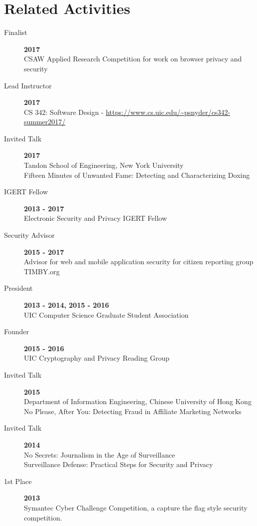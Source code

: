 \documentclass[wideaddress]{vitae}
\begin{document}
  \section{Related Activities}
  \begin{description}

    \item[Finalist] \hfill \textbf{2017}\\
    CSAW Applied Research Competition for work on browser privacy and security

    \item[Lead Instructor] \hfill \textbf{2017}\\
    CS 342: Software Design - \url{https://www.cs.uic.edu/~psnyder/cs342-summer2017/}

    \item[Invited Talk] \hfill \textbf{2017}\\
    Tandon School of Engineering, New York University\\
    Fifteen Minutes of Unwanted Fame: Detecting and Characterizing Doxing

    \item[IGERT Fellow] \hfill \textbf{2013 - 2017}\\
    Electronic Security and Privacy IGERT Fellow

    \item[Security Advisor] \hfill \textbf{2015 - 2017}\\
    Advisor for web and mobile application security for citizen reporting group TIMBY.org

    \item[President] \hfill \textbf{2013 - 2014, 2015 - 2016}\\
    UIC Computer Science Graduate Student Association

    \item[Founder] \hfill \textbf{2015 - 2016}\\
    UIC Cryptography and Privacy Reading Group

    \item[Invited Talk] \hfill \textbf{2015}\\
    Department of Information Engineering, Chinese University of Hong Kong\\
    No Please, After You: Detecting Fraud in Affiliate Marketing Networks

    \item[Invited Talk] \hfill \textbf{2014}\\
    No Secrets: Journalism in the Age of Surveillance\\
    Surveillance Defense: Practical Steps for Security and Privacy

    \item[1st Place] \hfill \textbf{2013}\\
    Symantec Cyber Challenge Competition, a capture the flag style security competition.
  \end{description}
\end{document}
